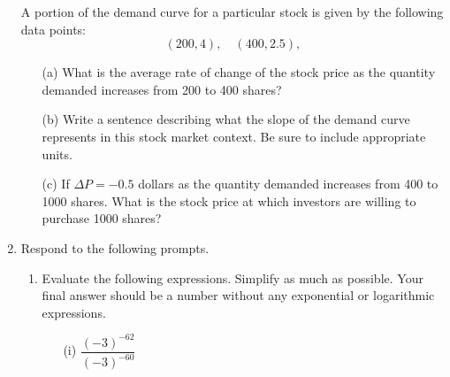 \documentclass[11pt]{article}
\begin{document}
\begin{enumerate}
A portion of the demand curve for a particular stock is given by the following data points:
\[
(200, 4), \quad (400, 2.5),
\]

\begin{enumerate}
\item[(a)] What is the average rate of change of the stock price as the quantity demanded increases from 200 to 400 shares?
\vspace{2.2cm}



\item[(b)] Write a sentence describing what the slope of the demand curve represents in this stock market context. Be sure to include appropriate units.
\vspace{2.2cm}

\item[(c)] If $\Delta P = -0.5$ dollars as the quantity demanded increases from 400 to 1000 shares. What is the stock price at which investors are willing to purchase 1000 shares?
\end{enumerate}


\newpage


\item Respond to the following prompts.

\begin{enumerate}
    \item Evaluate the following expressions. Simplify as much as possible. Your final answer should be a number without any exponential or logarithmic expressions.

    \begin{enumerate}
        \item[(i)] $\dfrac{(-3)^{-62}}{(-3)^{-60}}$

        \vfill


\end{enumerate}
\end{enumerate}
\end{enumerate}
\end{document}
